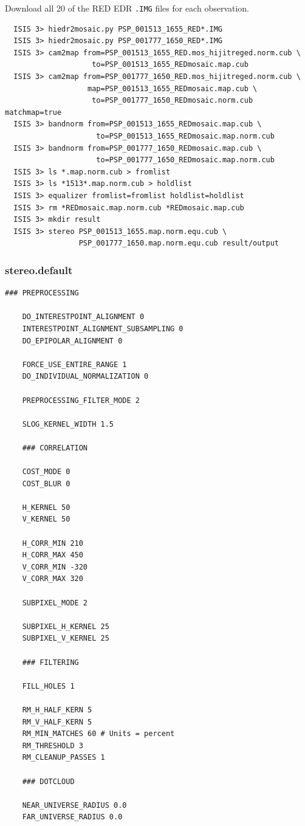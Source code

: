 Download all 20 of the RED EDR \texttt{.IMG} files for each observation.
\begin{verbatim}
  ISIS 3> hiedr2mosaic.py PSP_001513_1655_RED*.IMG
  ISIS 3> hiedr2mosaic.py PSP_001777_1650_RED*.IMG
  ISIS 3> cam2map from=PSP_001513_1655_RED.mos_hijitreged.norm.cub \
                    to=PSP_001513_1655_REDmosaic.map.cub
  ISIS 3> cam2map from=PSP_001777_1650_RED.mos_hijitreged.norm.cub \
                   map=PSP_001513_1655_REDmosaic.map.cub \
                    to=PSP_001777_1650_REDmosaic.norm.cub matchmap=true
  ISIS 3> bandnorm from=PSP_001513_1655_REDmosaic.map.cub \
                     to=PSP_001513_1655_REDmosaic.map.norm.cub
  ISIS 3> bandnorm from=PSP_001777_1650_REDmosaic.map.cub \
                     to=PSP_001777_1650_REDmosaic.map.norm.cub
  ISIS 3> ls *.map.norm.cub > fromlist
  ISIS 3> ls *1513*.map.norm.cub > holdlist
  ISIS 3> equalizer fromlist=fromlist holdlist=holdlist
  ISIS 3> rm *REDmosaic.map.norm.cub *REDmosaic.map.cub
  ISIS 3> mkdir result
  ISIS 3> stereo PSP_001513_1655.map.norm.equ.cub \
                 PSP_001777_1650.map.norm.equ.cub result/output
\end{verbatim}

\subsubsection*{stereo.default}

\begin{center}\begin{minipage}{5.5in}
\begin{Verbatim}[frame=single,fontsize=\small,label=stereo.default for HiRISE Columbia Hills]
    ### PREPROCESSING

    DO_INTERESTPOINT_ALIGNMENT 0
    INTERESTPOINT_ALIGNMENT_SUBSAMPLING 0
    DO_EPIPOLAR_ALIGNMENT 0

    FORCE_USE_ENTIRE_RANGE 1
    DO_INDIVIDUAL_NORMALIZATION 0

    PREPROCESSING_FILTER_MODE 2

    SLOG_KERNEL_WIDTH 1.5

    ### CORRELATION

    COST_MODE 0
    COST_BLUR 0

    H_KERNEL 50
    V_KERNEL 50

    H_CORR_MIN 210
    H_CORR_MAX 450
    V_CORR_MIN -320
    V_CORR_MAX 320

    SUBPIXEL_MODE 2

    SUBPIXEL_H_KERNEL 25
    SUBPIXEL_V_KERNEL 25

    ### FILTERING

    FILL_HOLES 1

    RM_H_HALF_KERN 5
    RM_V_HALF_KERN 5
    RM_MIN_MATCHES 60 # Units = percent
    RM_THRESHOLD 3
    RM_CLEANUP_PASSES 1

    ### DOTCLOUD

    NEAR_UNIVERSE_RADIUS 0.0
    FAR_UNIVERSE_RADIUS 0.0
\end{Verbatim}
\end{minipage}\end{center}

